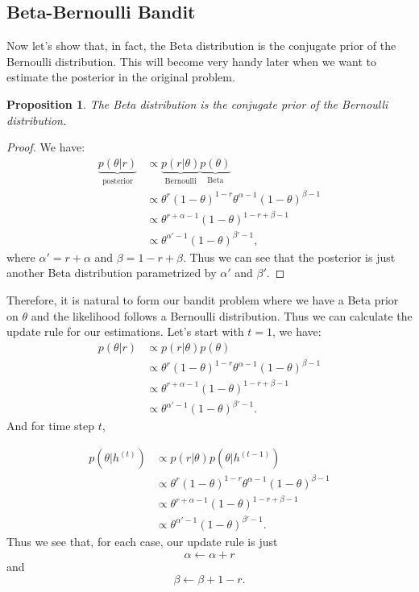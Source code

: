 \documentclass[11pt]{article}
\newtheorem{proposition}[theorem]{Proposition}
\begin{document}
\subsection{Beta-Bernoulli Bandit}
Now let's show that, in fact, the Beta distribution is the conjugate prior of the Bernoulli distribution. This will become very handy later when we want to estimate the posterior in the original problem.
\begin{proposition}
The Beta distribution is the conjugate prior of the Bernoulli distribution.
\end{proposition}
\begin{proof}
We have:
\begin{align*}
     \underbrace{p(\theta | r)}_{\text{posterior}} &\propto \underbrace{p(r|\theta)}_{\text{Bernoulli}} \underbrace{p(\theta)}_{\text{Beta}} \\
     &\propto \theta^r (1-\theta)^{1-r} \theta^{\alpha-1} (1-\theta)^{\beta-1}\\
     &\propto \theta^{r+\alpha-1} (1-\theta)^{1-r+\beta-1} \\
     &\propto \theta^{\alpha'-1} (1-\theta)^{\beta'-1},
\end{align*}
where $\alpha' = r+\alpha$ and $\beta = 1-r+\beta$. Thus we can see that the posterior is just another Beta distribution parametrized by $\alpha'$ and $\beta'$.
\end{proof}
Therefore, it is natural to form our bandit problem where we have a Beta prior on $\theta$ and the likelihood follows a Bernoulli distribution. Thus we can calculate the update rule for our estimations. Let's start with $t=1$, we have:
\begin{align*}
    p(\theta|r) &\propto p(r|\theta) p(\theta) \\
     &\propto \theta^r (1-\theta)^{1-r} \theta^{\alpha-1} (1-\theta)^{\beta-1}\\
     &\propto \theta^{r+\alpha-1} (1-\theta)^{1-r+\beta-1}\\
     &\propto \theta^{\alpha'-1} (1-\theta)^{\beta'-1}.
\end{align*}
And for time step $t$,

\begin{align*}
    p(\theta|h^{(t)}) &\propto p(r|\theta) p(\theta|h^{(t-1)}) \\
     &\propto \theta^r (1-\theta)^{1-r} \theta^{\alpha-1} (1-\theta)^{\beta-1}\\
     &\propto \theta^{r+\alpha-1} (1-\theta)^{1-r+\beta-1}\\
     &\propto \theta^{\alpha'-1} (1-\theta)^{\beta'-1}.
\end{align*}
Thus we see that, for each case, our update rule is just 
\[\alpha \xleftarrow{} \alpha + r\]
and 
\[\beta \xleftarrow{} \beta+1 - r.\]
\end{document}
